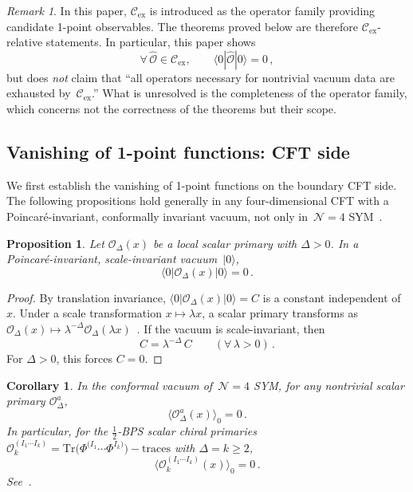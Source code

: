 \documentclass[
  aps,
  prd,
  preprint,
  groupedaddress,
  nofootinbib,
  longbibliography
]{revtex4-2}
\newtheorem{proposition}[definition]{Proposition}
\newtheorem{corollary}[definition]{Corollary}
\theoremstyle{remark}
\newtheorem{remark}[definition]{Remark}
\newcommand{\Cex}{\mathcal{C}_{\mathrm{ex}}}
\newcommand{\N}{\mathcal{N}}
\begin{document}
\begin{remark}\label{rem:Cex-relative}
In this paper, $\Cex$ is introduced as the operator family
providing candidate 1-point observables.
The theorems proved below are therefore $\Cex$-relative statements.
In particular, this paper shows
\begin{equation}\label{eq:Cex-vanishing}
  \forall\,\hat{\mathcal{O}}\in\Cex,\qquad
  \langle 0|\hat{\mathcal{O}}|0\rangle = 0\,,
\end{equation}
but does \emph{not} claim that ``all operators necessary for
nontrivial vacuum data are exhausted by~$\Cex$.''
What is unresolved is the completeness of the operator family,
which concerns not the correctness of the theorems but their scope.
\end{remark}

\subsection{Vanishing of 1-point functions: CFT side}\label{subsec:2-2}

We first establish the vanishing of 1-point functions on the
boundary CFT side.
The following propositions hold generally in any four-dimensional
CFT with a Poincar\'e-invariant, conformally invariant vacuum,
not only in~$\N=4$ SYM~\cite{ref5,ref6,ref13,ref14}.

\begin{proposition}\label{prop:scalar-vanish}
Let $\mathcal{O}_\Delta(x)$ be a local scalar primary with
$\Delta>0$.
In a Poincar\'e-invariant, scale-invariant vacuum~$|0\rangle$,
\begin{equation}\label{eq:scalar-vanish}
  \langle 0|\mathcal{O}_\Delta(x)|0\rangle = 0\,.
\end{equation}
\end{proposition}

\begin{proof}
By translation invariance,
$\langle 0|\mathcal{O}_\Delta(x)|0\rangle = C$ is a constant
independent of~$x$.
Under a scale transformation $x\mapsto\lambda x$, a scalar primary
transforms as
$\mathcal{O}_\Delta(x)\mapsto\lambda^{-\Delta}
\mathcal{O}_\Delta(\lambda x)$~\cite{ref13,ref14}.
If the vacuum is scale-invariant, then
\[
  C = \lambda^{-\Delta}\,C
  \qquad(\forall\,\lambda>0)\,.
\]
For $\Delta>0$, this forces $C=0$.
\end{proof}

\begin{corollary}\label{cor:scalar-N4}
In the conformal vacuum of~$\N=4$ SYM, for any nontrivial scalar
primary $\mathcal{O}_\Delta^a$,
\[
  \langle\mathcal{O}_\Delta^a(x)\rangle_0 = 0\,.
\]
In particular, for the $\tfrac{1}{2}$-BPS scalar chiral primaries
$\mathcal{O}_k^{(I_1\cdots I_k)}
= \mathrm{Tr}\bigl(\Phi^{(I_1}\cdots\Phi^{I_k)}\bigr)
-\text{traces}$
with $\Delta=k\ge 2$,
\[
  \langle\mathcal{O}_k^{(I_1\cdots I_k)}(x)\rangle_0
  = 0\,.
\]
See~\cite{ref4,ref5,ref6,ref7}.
\end{corollary}
\end{document}
